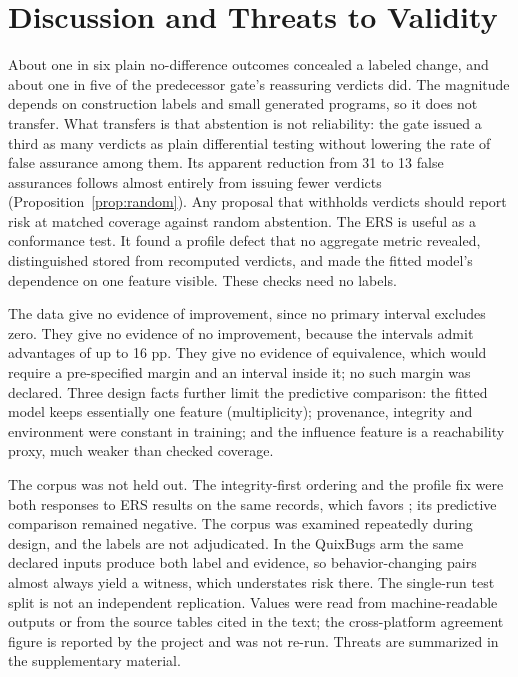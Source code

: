 \documentclass{ieeeaccess}
\begin{document}
\section{Discussion and Threats to Validity}\label{sec:discussion}
About one in six plain no-difference outcomes concealed a labeled change, and about one in five of the predecessor gate's reassuring verdicts did. The magnitude depends on construction labels and small generated programs, so it does not transfer. What transfers is that abstention is not reliability: the gate issued a third as many verdicts as plain differential testing without lowering the rate of false assurance among them. Its apparent reduction from 31 to 13 false assurances follows almost entirely from issuing fewer verdicts (Proposition~\ref{prop:random}). Any proposal that withholds verdicts should report risk at matched coverage against random abstention. The ERS is useful as a conformance test. It found a profile defect that no aggregate metric revealed, distinguished stored from recomputed verdicts, and made the fitted model's dependence on one feature visible. These checks need no labels.

The data give no evidence of improvement, since no primary interval excludes zero. They give no evidence of no improvement, because the intervals admit advantages of up to 16 pp. They give no evidence of equivalence, which would require a pre-specified margin and an interval inside it; no such margin was declared. Three design facts further limit the predictive comparison: the fitted model keeps essentially one feature (multiplicity); provenance, integrity and environment were constant in training; and the influence feature is a reachability proxy, much weaker than checked coverage.

The corpus was not held out. The integrity-first ordering and the profile fix were both responses to ERS results on the same records, which favors \sbg{}; its predictive comparison remained negative. The corpus was examined repeatedly during design, and the labels are not adjudicated. In the QuixBugs arm the same declared inputs produce both label and evidence, so behavior-changing pairs almost always yield a witness, which understates risk there. The single-run test split is not an independent replication. Values were read from machine-readable outputs or from the source tables cited in the text; the cross-platform agreement figure is reported by the project and was not re-run. Threats are summarized in the supplementary material.
\end{document}
